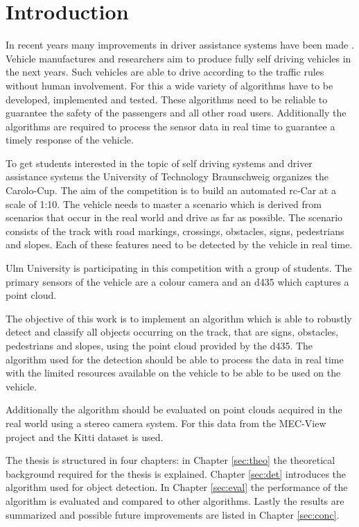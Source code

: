 \chapter{Introduction}

In recent years many improvements in driver assistance systems have been made \cite{autonomesFahren}.
Vehicle manufactures and researchers aim to produce fully self driving vehicles in the next years.
Such vehicles are able to drive according to the traffic rules without human involvement.
For this a wide variety of algorithms have to be developed, implemented and tested.
These algorithms need to be reliable to guarantee the safety of the passengers and all other road users. Additionally the algorithms are required to process the sensor data in real time to guarantee a timely response of the vehicle.

To get students interested in the topic of self driving systems and driver assistance systems the University of Technology Braunschweig organizes the Carolo-Cup. The aim of the competition is
to build an automated \ac{rc}-Car at a scale of 1:10. 
The vehicle needs to master a scenario which is derived from scenarios that occur in the real world and drive as far as possible. 
The scenario consists of the track with road markings, crossings, obstacles, signs, pedestrians and slopes. Each of these features need to be detected by the vehicle in real time.

Ulm University is participating in this competition with a group of students. The primary sensors of the vehicle are a colour camera and an \ac{d435} which captures a point cloud.

The objective of this work is to implement an algorithm which is able to robustly detect and classify all objects occurring on the track, that are signs, obstacles, pedestrians and slopes, using the point cloud provided by the \ac{d435}. 
The algorithm used for the detection should be able to process the data in real time with the limited resources available on the vehicle to be able to be used on the vehicle.

Additionally the algorithm should be evaluated on point clouds acquired in the real world using a stereo camera system. For this data from the MEC-View project \cite{mec} and the Kitti dataset \cite{Menze2015CVPR} is used.

The thesis is structured in four chapters:
in Chapter \ref{sec:theo} the theoretical background required for the thesis is explained. Chapter \ref{sec:det} introduces the algorithm used for object detection. In Chapter \ref{sec:eval} the performance of the algorithm is evaluated and compared to other algorithms. Lastly the results are summarized and possible future improvements are listed in Chapter \ref{sec:conc}.

